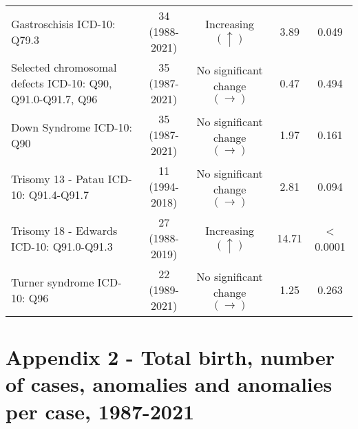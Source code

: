 \documentclass[
]{krantz}
\begin{document}
\begin{longtable}[t]{>{\raggedright\arraybackslash}p{4cm}cccc}
Gastroschisis\newline  \tiny{ ICD-10: Q79.3} & \makecell[c]{34\\ \tiny{(1988-2021)}} & Increasing $\left(\uparrow \right)$ & 3.89 & 0.049\\
Selected chromosomal defects\newline  \tiny{ ICD-10: Q90, Q91.0-Q91.7, Q96} & \makecell[c]{35\\ \tiny{(1987-2021)}} & \makecell[c]{No significant \\ change $\left(\rightarrow \right)$} & 0.47 & 0.494\\
\addlinespace
Down Syndrome\newline  \tiny{ ICD-10: Q90} & \makecell[c]{35\\ \tiny{(1987-2021)}} & \makecell[c]{No significant \\ change $\left(\rightarrow \right)$} & 1.97 & 0.161\\
Trisomy 13 - Patau\newline  \tiny{ ICD-10: Q91.4-Q91.7} & \makecell[c]{11\\ \tiny{(1994-2018)}} & \makecell[c]{No significant \\ change $\left(\rightarrow \right)$} & 2.81 & 0.094\\
Trisomy 18 - Edwards\newline  \tiny{ ICD-10: Q91.0-Q91.3} & \makecell[c]{27\\ \tiny{(1988-2019)}} & Increasing $\left(\uparrow \right)$ & 14.71 & < 0.0001\\
Turner syndrome\newline  \tiny{ ICD-10: Q96} & \makecell[c]{22\\ \tiny{(1989-2021)}} & \makecell[c]{No significant \\ change $\left(\rightarrow \right)$} & 1.25 & 0.263\\*
\end{longtable}
\endgroup{}

\clearpage

\hypertarget{section-a2}{%
\section{Appendix 2 - Total birth, number of cases, anomalies and anomalies per case, 1987-2021}\label{section-a2}}

\begingroup\fontsize{7}{9}\selectfont
\end{document}
